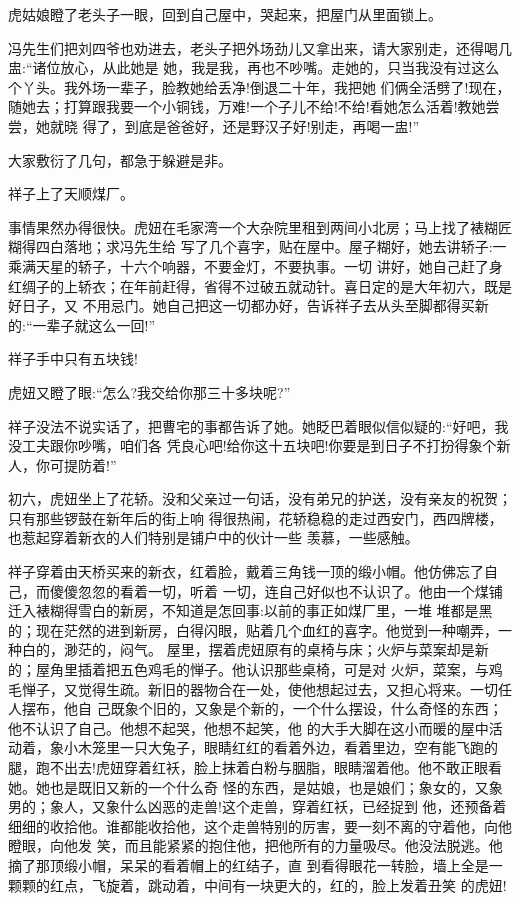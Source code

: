 \documentclass[11pt,a4paper,onecolumn]{article}
\begin{document}
虎姑娘瞪了老头子一眼，回到自己屋中，哭起来，把屋门从里面锁上。

冯先生们把刘四爷也劝进去，老头子把外场劲儿又拿出来，请大家别走，还得喝几盅:``诸位放心，从此她是
她，我是我，再也不吵嘴。走她的，只当我没有过这么个丫头。我外场一辈子，脸教她给丢净!倒退二十年，我把她
们俩全活劈了!现在，随她去；打算跟我要一个小铜钱，万难!一个子儿不给!不给!看她怎么活着!教她尝尝，她就晓
得了，到底是爸爸好，还是野汉子好!别走，再喝一盅!''

大家敷衍了几句，都急于躲避是非。

祥子上了天顺煤厂。

事情果然办得很快。虎妞在毛家湾一个大杂院里租到两间小北房；马上找了裱糊匠糊得四白落地；求冯先生给
写了几个喜字，贴在屋中。屋子糊好，她去讲轿子:一乘满天星的轿子，十六个响器，不要金灯，不要执事。一切
讲好，她自己赶了身红绸子的上轿衣；在年前赶得，省得不过破五就动针。喜日定的是大年初六，既是好日子，又
不用忌门。她自己把这一切都办好，告诉祥子去从头至脚都得买新的:``一辈子就这么一回!''

祥子手中只有五块钱!

虎妞又瞪了眼:``怎么?我交给你那三十多块呢?''

祥子没法不说实话了，把曹宅的事都告诉了她。她眨巴着眼似信似疑的:``好吧，我没工夫跟你吵嘴，咱们各
凭良心吧!给你这十五块吧!你要是到日子不打扮得象个新人，你可提防着!''

初六，虎妞坐上了花轿。没和父亲过一句话，没有弟兄的护送，没有亲友的祝贺；只有那些锣鼓在新年后的街上响
得很热闹，花轿稳稳的走过西安门，西四牌楼，也惹起穿着新衣的人们\myrule 特别是铺户中的伙计\myrule 一些
羡慕，一些感触。

祥子穿着由天桥买来的新衣，红着脸，戴着三角钱一顶的缎小帽。他仿佛忘了自己，而傻傻忽忽的看着一切，听着
一切，连自己好似也不认识了。他由一个煤铺迁入裱糊得雪白的新房，不知道是怎回事:以前的事正如煤厂里，一堆
堆都是黑的；现在茫然的进到新房，白得闪眼，贴着几个血红的喜字。他觉到一种嘲弄，一种白的，渺茫的，闷气。
屋里，摆着虎妞原有的桌椅与床；火炉与菜案却是新的；屋角里插着把五色鸡毛的惮子。他认识那些桌椅，可是对
火炉，菜案，与鸡毛惮子，又觉得生疏。新旧的器物合在一处，使他想起过去，又担心将来。一切任人摆布，他自
己既象个旧的，又象是个新的，一个什么摆设，什么奇怪的东西；他不认识了自己。他想不起哭，他想不起笑，他
的大手大脚在这小而暖的屋中活动着，象小木笼里一只大兔子，眼睛红红的看着外边，看着里边，空有能飞跑的
腿，跑不出去!虎妞穿着红袄，脸上抹着白粉与胭脂，眼睛溜着他。他不敢正眼看她。她也是既旧又新的一个什么奇
怪的东西，是姑娘，也是娘们；象女的，又象男的；象人，又象什么凶恶的走兽!这个走兽，穿着红袄，已经捉到
他，还预备着细细的收拾他。谁都能收拾他，这个走兽特别的厉害，要一刻不离的守着他，向他瞪眼，向他发
笑，而且能紧紧的抱住他，把他所有的力量吸尽。他没法脱逃。他摘了那顶缎小帽，呆呆的看着帽上的红结子，直
到看得眼花\myrule 一转脸，墙上全是一颗颗的红点，飞旋着，跳动着，中间有一块更大的，红的，脸上发着丑笑
的虎妞!
\end{document}

